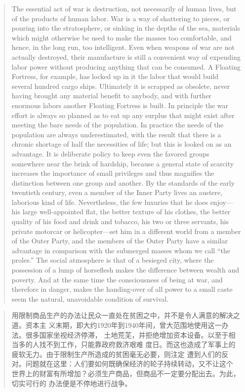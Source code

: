 \begin{paracol}{2}
\begin{quotation}
The essential act of war is destruction, not necessarily of human lives,
but of the products of human labor. War is a way of shattering to
pieces, or pouring into the stratosphere, or sinking in the depths of
the sea, materials which might otherwise be used to make the masses too
comfortable, and hence, in the long run, too intelligent. Even when
weapons of war are not actually destroyed, their manufacture is still a
convenient way of expending labor power without producing anything that
can be consumed. A Floating Fortress, for example, has locked up in it
the labor that would build several hundred cargo ships. Ultimately it is
scrapped as obsolete, never having brought any material benefit to
anybody, and with further enormous labors another Floating Fortress is
built. In principle the war effort is always so planned as to eat up any
surplus that might exist after meeting the bare needs of the population.
In practice the needs of the population are always underestimated, with
the result that there is a chronic shortage of half the necessities of
life; but this is looked on as an advantage. It is deliberate policy to
keep even the favored groups somewhere near the brink of hardship,
because a general state of scarcity increases the importance of small
privileges and thus magnifies the distinction between one group and
another. By the standards of the early twentieth century, even a member
of the Inner Party lives an austere, laborious kind of life.
Nevertheless, the few luxuries that he does enjoy---his large
well-appointed flat, the better texture of his clothes, the better
quality of his food and drink and tobacco, his two or three servants,
his private motorcar or helicopter---set him in a different world from a
member of the Outer Party, and the members of the Outer Party have a
similar advantage in comparison with the submerged masses whom we call
``the proles.'' The social atmosphere is that of a besieged city, where
the possession of a lump of horseflesh makes the difference between
wealth and poverty. And at the same time the consciousness of being at
war, and therefore in danger, makes the handing-over of all power to a
small caste seem the natural, unavoidable condition of survival.
\end{quotation}

\switchcolumn

\begin{quotation}
用限制商品生产的办法让民众一直处在贫困之中，并不是令人满意的解决之道。资本主
义末期，即大约1920年到1940年间，曾大范围地使用这一办法。很多国家坐视经济停滞，
土地荒芜，并拒绝增加资本设备。以至于相当多的人找不到工作，只能靠政府救济艰难
度日。而这也造成了军事上的疲软无力。由于限制生产所造成的贫困毫无必要，则注定
遭到人们的反对。问题就在这里：人们要如何既确保经济的轮子持续转动，又不让这个
世界上的财富有所增加？必须生产商品，但商品不一定要分配出去。为此，切实可行的
办法便是不停地进行战争。
\end{quotation}


\end{paracol}
